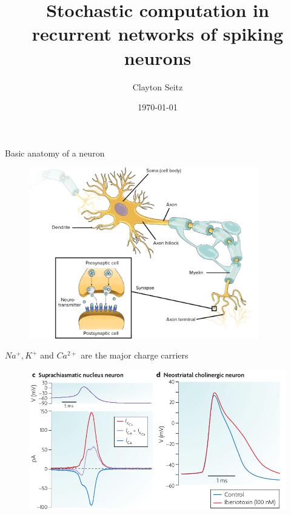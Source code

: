 \documentclass[aspectratio=169]{beamer}
\begin{document}
\title{Stochastic computation in recurrent networks of spiking neurons}  
\author{Clayton Seitz}
\date{\today} 

\maketitle


\begin{frame}{Basic anatomy of a neuron}

\begin{figure}
\centering
\includegraphics[width=100mm]{figure-0}
\end{figure}


\end{frame}


\begin{frame}{$Na^{+}, K^{+}$ and $Ca^{2+}$ are the major charge carriers}

\begin{figure}
\centering
\includegraphics[width=125mm]{figure-11}
\end{figure}

\end{frame}
\end{document}
